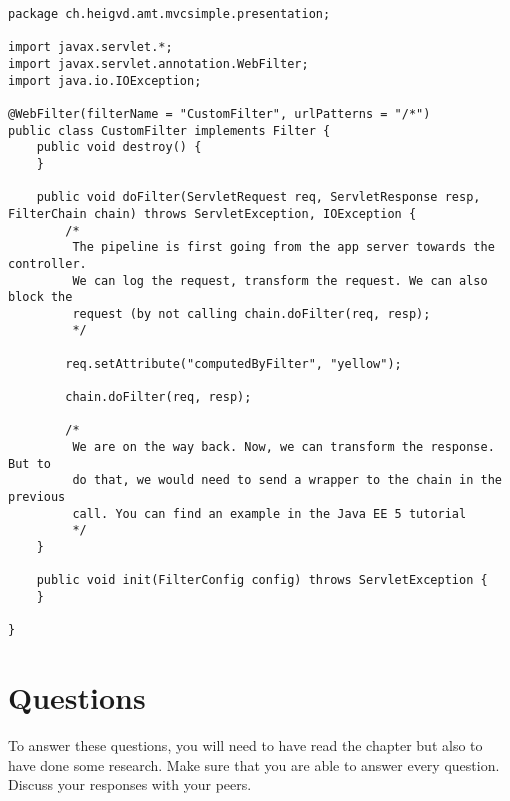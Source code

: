 \vspace{10pt}
\begin{minipage}{\linewidth}
\begin{lstlisting}[frame=single]
package ch.heigvd.amt.mvcsimple.presentation;

import javax.servlet.*;
import javax.servlet.annotation.WebFilter;
import java.io.IOException;

@WebFilter(filterName = "CustomFilter", urlPatterns = "/*")
public class CustomFilter implements Filter {
    public void destroy() {
    }

    public void doFilter(ServletRequest req, ServletResponse resp, FilterChain chain) throws ServletException, IOException {
        /*
         The pipeline is first going from the app server towards the controller.
         We can log the request, transform the request. We can also block the 
         request (by not calling chain.doFilter(req, resp);
         */

        req.setAttribute("computedByFilter", "yellow");

        chain.doFilter(req, resp);

        /*
         We are on the way back. Now, we can transform the response. But to
         do that, we would need to send a wrapper to the chain in the previous 
         call. You can find an example in the Java EE 5 tutorial
         */
    }

    public void init(FilterConfig config) throws ServletException {
    }

}
\end{lstlisting}
\end{minipage}

\section{Questions}

To answer these questions, you will need to have read the chapter but also to have done some research. Make sure that you are able to answer every question. Discuss your responses with your peers.

